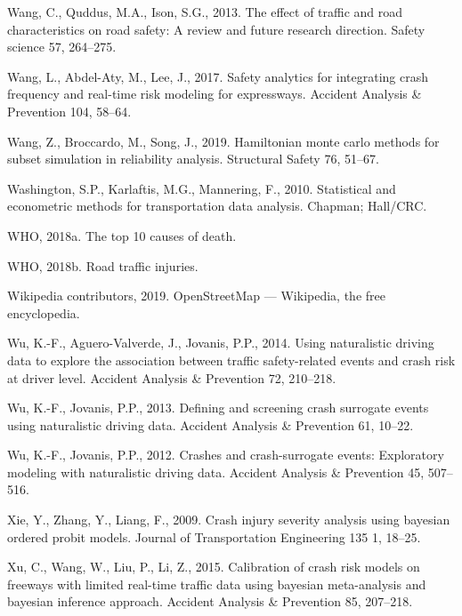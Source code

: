 \documentclass[12pt]{book}
\numberwithin{equation}{chapter}
\begin{document}
\leavevmode\hypertarget{ref-wang2013effect}{}%
Wang, C., Quddus, M.A., Ison, S.G., 2013. The effect of traffic and road characteristics on road safety: A review and future research direction. Safety science 57, 264--275.

\leavevmode\hypertarget{ref-wang2017safety}{}%
Wang, L., Abdel-Aty, M., Lee, J., 2017. Safety analytics for integrating crash frequency and real-time risk modeling for expressways. Accident Analysis \& Prevention 104, 58--64.

\leavevmode\hypertarget{ref-wang2019hamiltonian}{}%
Wang, Z., Broccardo, M., Song, J., 2019. Hamiltonian monte carlo methods for subset simulation in reliability analysis. Structural Safety 76, 51--67.

\leavevmode\hypertarget{ref-washington2010statistical}{}%
Washington, S.P., Karlaftis, M.G., Mannering, F., 2010. Statistical and econometric methods for transportation data analysis. Chapman; Hall/CRC.

\leavevmode\hypertarget{ref-who2018}{}%
WHO, 2018a. The top 10 causes of death.

\leavevmode\hypertarget{ref-who2018b}{}%
WHO, 2018b. Road traffic injuries.

\leavevmode\hypertarget{ref-wikiOSM}{}%
Wikipedia contributors, 2019. OpenStreetMap --- Wikipedia, the free encyclopedia.

\leavevmode\hypertarget{ref-wu2014using}{}%
Wu, K.-F., Aguero-Valverde, J., Jovanis, P.P., 2014. Using naturalistic driving data to explore the association between traffic safety-related events and crash risk at driver level. Accident Analysis \& Prevention 72, 210--218.

\leavevmode\hypertarget{ref-wu2013defining}{}%
Wu, K.-F., Jovanis, P.P., 2013. Defining and screening crash surrogate events using naturalistic driving data. Accident Analysis \& Prevention 61, 10--22.

\leavevmode\hypertarget{ref-wu2012crashes}{}%
Wu, K.-F., Jovanis, P.P., 2012. Crashes and crash-surrogate events: Exploratory modeling with naturalistic driving data. Accident Analysis \& Prevention 45, 507--516.

\leavevmode\hypertarget{ref-xie2009crash}{}%
Xie, Y., Zhang, Y., Liang, F., 2009. Crash injury severity analysis using bayesian ordered probit models. Journal of Transportation Engineering 135 1, 18--25.

\leavevmode\hypertarget{ref-xu2015calibration}{}%
Xu, C., Wang, W., Liu, P., Li, Z., 2015. Calibration of crash risk models on freeways with limited real-time traffic data using bayesian meta-analysis and bayesian inference approach. Accident Analysis \& Prevention 85, 207--218.
\end{document}
